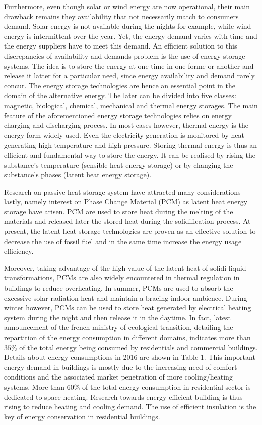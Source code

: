 Furthermore, even though solar or wind energy are now operational, their main drawback remains they availability that not necessarily match to consumers demand.
Solar energy is not available during the nights for example, while wind energy is intermittent over the year.
Yet, the energy demand varies with time and the energy suppliers have to meet this demand.
An efficient solution to this discrepancies of availability and demands problem is the use of energy storage systems.
The idea is to store the energy at one time in one forme or another and release it latter for a particular need, since energy availability and demand rarely concur.
The energy storage technologies are hence an essential point in the domain of the alternative energy.
The later can be divided into five classes:
magnetic, biological, chemical, mechanical and thermal energy storages.
The main feature of the aforementioned energy storage technologies relies on energy charging and discharging process.
In most cases however, thermal energy is the energy form widely used.
Even the electricity generation is monitored by heat generating high temperature and high pressure.
Storing thermal energy is thus an efficient and fundamental way to store the energy.
It can be realised by rising the substance's temperature (sensible heat energy storage) or by changing the substance's phases (latent heat energy storage).

Research on passive heat storage system have attracted many considerations lastly, namely interest on Phase Change Material (PCM) as latent heat energy storage have arisen.
PCM are used to store heat during the melting of the materials and released later the stored heat during the solidification process.
At present, the latent heat storage technologies are proven as an effective solution to decrease the use of fossil fuel and in the same time increase the energy usage efficiency.

Moreover, taking advantage of the high value of the latent heat of solidi-liquid transformations, PCMs are also widely encountered in thermal regulation in buildings to reduce overheating.
In summer, PCMs are used to absorb the excessive solar radiation heat and maintain a bracing indoor ambience.
During winter however, PCMs can be used to store heat generated by electrical heating system during the night and then release it in the daytime.
In fact, latest announcement of the french ministry of ecological transition, detailing the repartition of the energy consumption in different domains, indicates more than $35 \%$ of the total energy being consumed by residentials and commercial buildings. Details about energy consumptions in 2016 are shown in Table 1.
This important energy demand in buildings is mostly due to the increasing need of comfort conditions and the associated market penetration of more cooling/heating systems.
More than $60\%$ of the total energy consumption in residential sector is dedicated to space heating.
Research towards energy-efficient building is thus rising to reduce heating and cooling demand.
The use of efficient insulation is the key of energy conservation in residential buildings.


